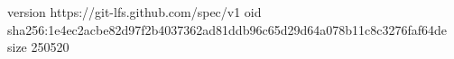 version https://git-lfs.github.com/spec/v1
oid sha256:1e4ec2acbe82d97f2b4037362ad81ddb96c65d29d64a078b11c8c3276faf64de
size 250520
